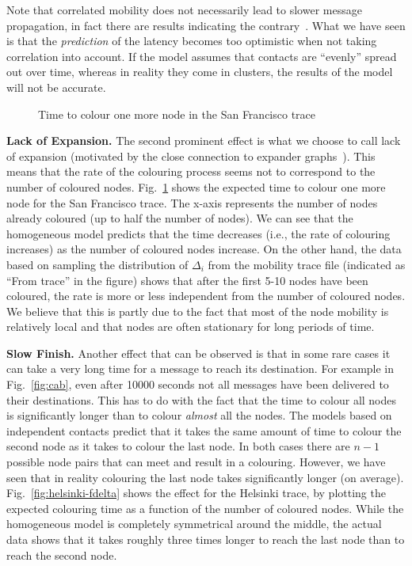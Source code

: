 \documentclass{article}
\begin{document}
Note that correlated mobility does not necessarily lead to slower
message propagation, in fact there are results indicating the
contrary~\cite{ciullo11}. What we have seen is that the \emph{prediction} of
the latency becomes too optimistic when not taking correlation into
account. If the model assumes that contacts are ``evenly'' spread out
over time, whereas in reality they come in clusters, the results of
the model will not be accurate.

\begin{figure}[tb]
  \centering
   \caption{Time to colour one more node in the San Francisco trace}
  \label{fig:cabcol}
\end{figure}

{\bf Lack of Expansion.} The second prominent effect is what we choose
to call lack of expansion (motivated by the close connection to
expander graphs~\cite{asplund12worst}). This means that the rate of
the colouring process seems not to correspond to the number of
coloured nodes. Fig.~\ref{fig:cabcol} shows the expected time to
colour one more node for the San Francisco trace. The x-axis
represents the number of nodes already coloured (up to half the number
of nodes). We can see that the homogeneous model predicts that the
time decreases (i.e., the rate of colouring increases) as the number
of coloured nodes increase. On the other hand, the data based on
sampling the distribution of $\Delta_i$ from the mobility trace file
(indicated as ``From trace'' in the figure) shows that after the first
5-10 nodes have been coloured, the rate is more or less independent
from the number of coloured nodes. We believe that this is partly due
to the fact that most of the node mobility is relatively local and
that nodes are often stationary for long periods of time.
 
{\bf Slow Finish.} Another effect that can be observed is that in some
rare cases it can take a very long time for a message to reach its
destination. For example in Fig.~\ref{fig:cab}, even after 10000
seconds not all messages have been delivered to their destinations. This
has to do with the fact that the time to colour all nodes is
significantly longer than to colour \emph{almost} all the nodes. The
models based on independent contacts predict that it takes the same
amount of time to colour the second node as it takes to colour the
last node. In both cases there are $n-1$ possible node pairs that can
meet and result in a colouring. However, we have seen that in reality
colouring the last node takes significantly longer (on
average). Fig.~\ref{fig:helsinki-fdelta} shows the effect for the
Helsinki trace, by plotting the expected colouring time as a function
of the number of coloured nodes. While the homogeneous model is
completely symmetrical around the middle, the actual data shows that
it takes roughly three times longer to reach the last node than to
reach the second node.
\end{document}
